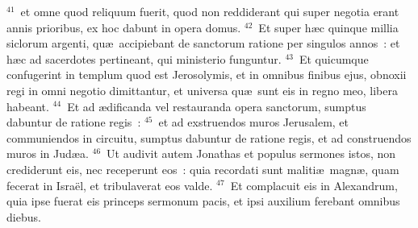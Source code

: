 ${}^{41}$~et omne quod reliquum fuerit, quod non reddiderant qui super negotia erant annis prioribus, ex hoc dabunt in opera domus.
${}^{42}$~Et super h\ae c quinque millia siclorum argenti, qu\ae\ accipiebant de sanctorum ratione per singulos annos~: et h\ae c ad sacerdotes pertineant, qui ministerio funguntur.
${}^{43}$~Et quicumque confugerint in templum quod est Jerosolymis, et in omnibus finibus ejus, obnoxii regi in omni negotio dimittantur, et universa qu\ae\ sunt eis in regno meo, libera habeant.
${}^{44}$~Et ad \ae dificanda vel restauranda opera sanctorum, sumptus dabuntur de ratione regis~:
${}^{45}$~et ad exstruendos muros Jerusalem, et communiendos in circuitu, sumptus dabuntur de ratione regis, et ad construendos muros in Jud\ae a.
${}^{46}$~Ut audivit autem Jonathas et populus sermones istos, non crediderunt eis, nec receperunt eos~: quia recordati sunt maliti\ae\ magn\ae , quam fecerat in Isra\"el, et tribulaverat eos valde.
${}^{47}$~Et complacuit eis in Alexandrum, quia ipse fuerat eis princeps sermonum pacis, et ipsi auxilium ferebant omnibus diebus.


